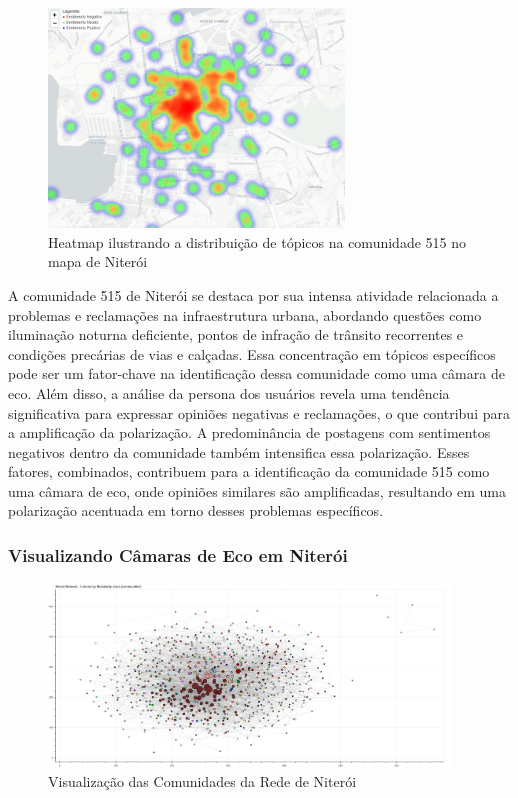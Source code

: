 \begin{figure}[htb]
	\centering
	\includegraphics[width=0.7\textwidth]{images/echo_chamber_niteroi_heatmap.PNG}
	\caption{Heatmap ilustrando a distribuição de tópicos na comunidade 515 no mapa de Niterói}
	\label{fig:echo_chamber_niteroi_heatmap}
\end{figure}

A comunidade 515 de Niterói se destaca por sua intensa atividade relacionada a problemas e reclamações na infraestrutura urbana, abordando questões como iluminação noturna deficiente, pontos de infração de trânsito recorrentes e condições precárias de vias e calçadas. Essa concentração em tópicos específicos pode ser um fator-chave na identificação dessa comunidade como uma câmara de eco. Além disso, a análise da persona dos usuários revela uma tendência significativa para expressar opiniões negativas e reclamações, o que contribui para a amplificação da polarização. A predominância de postagens com sentimentos negativos dentro da comunidade também intensifica essa polarização. Esses fatores, combinados, contribuem para a identificação da comunidade 515 como uma câmara de eco, onde opiniões similares são amplificadas, resultando em uma polarização acentuada em torno desses problemas específicos.

\subsubsection*{Visualizando Câmaras de Eco em Niterói}

\begin{figure}[htb]
	\centering
	\includegraphics[width=0.95\textwidth]{images/network_communities_niteroi.png}
	\caption{Visualização das Comunidades da Rede de Niterói}
	\label{fig:network_communities_niteroi}
\end{figure}

